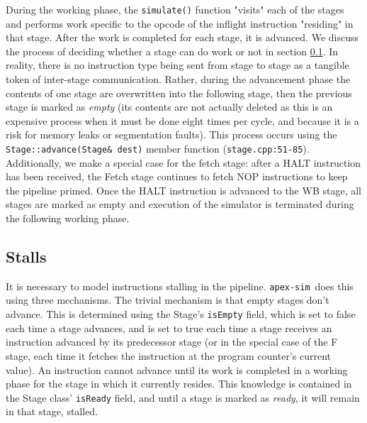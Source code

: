 \documentclass[12pt]{article}
\newcommand{\codename}[0]{\texttt{apex-sim}~}
\begin{document}
During the working phase, the \texttt{simulate()} function "visits" each of the stages and performs work specific to the opcode of the inflight instruction "residing" in that stage. 
After the work is completed for each stage, it is advanced. 
We discuss the process of deciding whether a stage can do work or not in section \ref{sec:stalls}. 
In reality, there is no instruction type being sent from stage to stage as a tangible token of inter-stage communication. 
Rather, during the advancement phase the contents of one stage are overwritten into the following stage, then the previous stage is marked as \textit{empty} (its contents are not actually deleted as this is an expensive process when it must be done eight times per cycle, and because it is a risk for memory leaks or segmentation faults). 
This process occurs using the \texttt{Stage::advance(Stage\& dest)} member function (\texttt{stage.cpp:51-85}).
Additionally, we make a special case for the fetch stage: after a HALT instruction has been received, the Fetch stage continues to fetch NOP instructions to keep the pipeline primed. 
Once the HALT instruction is advanced to the WB stage, all stages are marked as empty and execution of the simulator is terminated during the following working phase.

\subsection{Stalls}
\label{sec:stalls}
It is necessary to model instructions stalling in the pipeline. 
\codename does this using three mechanisms.
The trivial mechanism is that empty stages don't advance. 
This is determined using the Stage's \texttt{isEmpty} field, which is set to false each time a stage advances, and is set to true each time a stage receives an instruction advanced by its predecessor stage (or in the special case of the F stage, each time it fetches the instruction at the program counter's current value).
An instruction cannot advance until its work is completed in a working phase for the stage in which it currently resides.
This knowledge is contained in the Stage class' \texttt{isReady} field, and until a stage is marked as \textit{ready}, it will remain in that stage, stalled.
\end{document}
